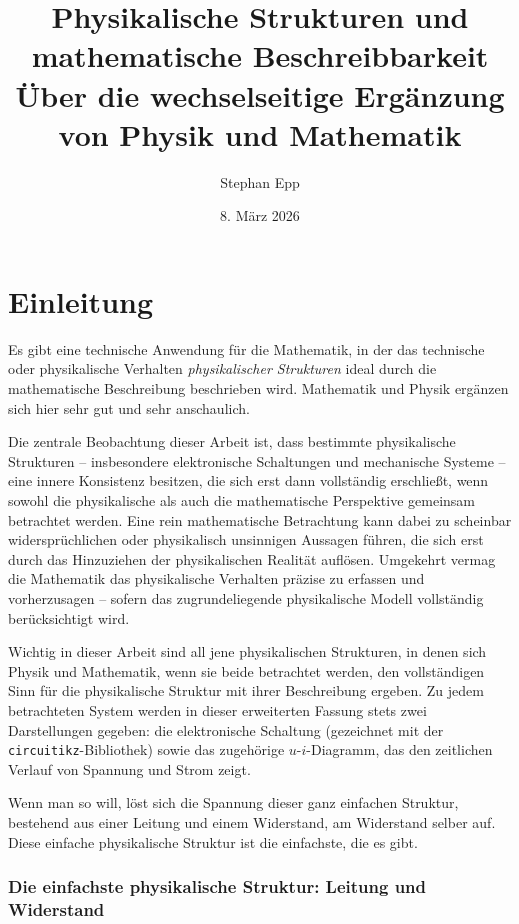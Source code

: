 ﻿\documentclass[12pt, a4paper]{article}
\title{\textbf{Physikalische Strukturen und\\ mathematische Beschreibbarkeit}\\
	\large Über die wechselseitige Ergänzung von Physik und Mathematik}
\author{Stephan Epp}
\date{8. März 2026}
\begin{document}
	
	\maketitle
	\tableofcontents
	\newpage
	
	\section{Einleitung}
	
	Es gibt eine technische Anwendung für die Mathematik, in der das technische oder physikalische Verhalten \textit{physikalischer Strukturen} ideal durch die mathematische Beschreibung beschrieben wird. Mathematik und Physik ergänzen sich hier sehr gut und sehr anschaulich.
	
	Die zentrale Beobachtung dieser Arbeit ist, dass bestimmte physikalische Strukturen -- insbesondere elektronische Schaltungen und mechanische Systeme -- eine innere Konsistenz besitzen, die sich erst dann vollständig erschließt, wenn sowohl die physikalische als auch die mathematische Perspektive gemeinsam betrachtet werden. Eine rein mathematische Betrachtung kann dabei zu scheinbar widersprüchlichen oder physikalisch unsinnigen Aussagen führen, die sich erst durch das Hinzuziehen der physikalischen Realität auflösen. Umgekehrt vermag die Mathematik das physikalische Verhalten präzise zu erfassen und vorherzusagen -- sofern das zugrundeliegende physikalische Modell vollständig berücksichtigt wird.
	
	Wichtig in dieser Arbeit sind all jene physikalischen Strukturen, in denen sich Physik und Mathematik, wenn sie beide betrachtet werden, den vollständigen Sinn für die physikalische Struktur mit ihrer Beschreibung ergeben. Zu jedem betrachteten System werden in dieser erweiterten Fassung stets zwei Darstellungen gegeben: die elektronische Schaltung (gezeichnet mit der \texttt{circuitikz}-Bibliothek) sowie das zugehörige $u$-$i$-Diagramm, das den zeitlichen Verlauf von Spannung und Strom zeigt.
	
	Wenn man so will, löst sich die Spannung dieser ganz einfachen Struktur, bestehend aus einer Leitung und einem Widerstand, am Widerstand selber auf. Diese einfache physikalische Struktur ist die einfachste, die es gibt.

	\subsubsection*{Die einfachste physikalische Struktur: Leitung und Widerstand}
\end{document}
